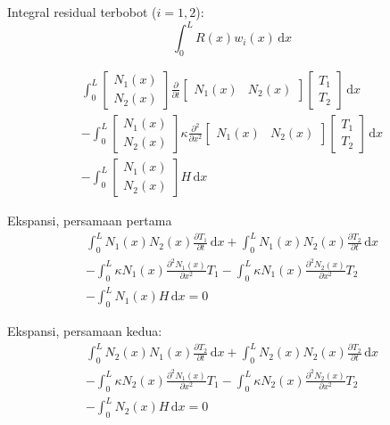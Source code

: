 Integral residual terbobot ($i=1,2$):
\begin{equation}
\int_{0}^{L} R(x) w_{i}(x) \, \mathrm{d}x
\end{equation}

\begin{align*}
\int_{0}^{L} \begin{bmatrix} N_{1}(x) \\ N_{2}(x) \end{bmatrix}
\frac{\partial}{\partial t}
\begin{bmatrix} N_{1}(x) & N_{2}(x) \end{bmatrix}
\begin{bmatrix} T_{1} \\ T_{2} \end{bmatrix}\,\mathrm{d}x \\
- \int_{0}^{L} \begin{bmatrix} N_{1}(x) \\ N_{2}(x) \end{bmatrix}
\kappa \frac{\partial^2}{\partial x^2}
\begin{bmatrix} N_{1}(x) & N_{2}(x) \end{bmatrix}
\begin{bmatrix} T_{1} \\ T_{2} \end{bmatrix}\,\mathrm{d}x \\
- \int_{0}^{L} \begin{bmatrix} N_{1}(x) \\ N_{2}(x) \end{bmatrix} H \, \mathrm{d}x
\end{align*}

Ekspansi, persamaan pertama
\begin{align*}
\int_{0}^{L} N_{1}(x) N_{2}(x) \frac{\partial T_1}{\partial t}\, \mathrm{d}x
+ \int_{0}^{L} N_{1}(x) N_{2}(x) \frac{\partial T_2}{\partial t}\, \mathrm{d}x \\
- \int_{0}^{L} \kappa N_{1}(x) \frac{\partial^2 N_{1}(x)}{\partial x^2} T_{1}
- \int_{0}^{L} \kappa N_{1}(x) \frac{\partial^2 N_{2}(x)}{\partial x^2} T_{2} \\
- \int_{0}^{L} N_{1}(x) H \, \mathrm{d}x = 0
\end{align*}

Ekspansi, persamaan kedua:
\begin{align*}
\int_{0}^{L} N_{2}(x) N_{1}(x) \frac{\partial T_2}{\partial t}\, \mathrm{d}x
+ \int_{0}^{L} N_{2}(x) N_{2}(x) \frac{\partial T_2}{\partial t}\, \mathrm{d}x \\
- \int_{0}^{L} \kappa N_{2}(x) \frac{\partial^2 N_{1}(x)}{\partial x^2} T_{1}
- \int_{0}^{L} \kappa N_{2}(x) \frac{\partial^2 N_{2}(x)}{\partial x^2} T_{2} \\
- \int_{0}^{L} N_{2}(x) H \, \mathrm{d}x = 0
\end{align*}

